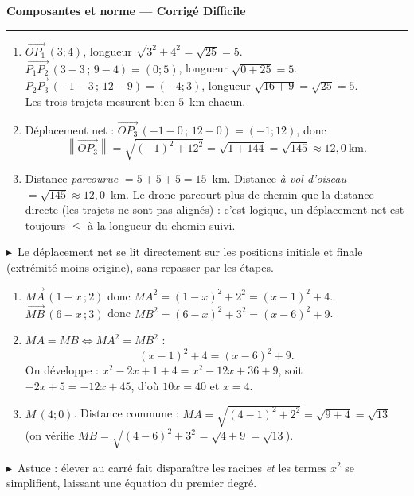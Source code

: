 \documentclass[11pt,a4paper]{article}
\newcommand{\vc}[1]{\overrightarrow{#1}}
\providecommand{\norm}[1]{\left\lVert #1\right\rVert}
\newcommand{\cor}[1]{\medskip\noindent{\color{primarydark}\bfseries\large Corrigé #1.}\par\smallskip}
\newcommand{\rep}{\textcolor{excol}{$\blacktriangleright$}\ }
\begin{document}
\begin{center}
{\LARGE\bfseries\color{primarydark}Composantes et norme — Corrigé Difficile}\\[2pt]
{\color{primary}\rule{0.5\linewidth}{1.1pt}}
\end{center}
\vspace{2mm}

\cor{1}
\begin{enumerate}[label=\textbf{\alph*)},leftmargin=2em,itemsep=3pt]
  \item $\vc{OP_1}\,(3;4)$, longueur $\sqrt{3^2+4^2}=\sqrt{25}=5$.\\
        $\vc{P_1P_2}\,(3-3\,;\,9-4)=(0;5)$, longueur $\sqrt{0+25}=5$.\\
        $\vc{P_2P_3}\,(-1-3\,;\,12-9)=(-4;3)$, longueur $\sqrt{16+9}=\sqrt{25}=5$.\\
        Les trois trajets mesurent bien $5$~km chacun.
  \item Déplacement net : $\vc{OP_3}\,(-1-0\,;\,12-0)=(-1;12)$, donc
        \[\norm{\vc{OP_3}}=\sqrt{(-1)^2+12^2}=\sqrt{1+144}=\sqrt{145}\approx 12{,}0~\text{km}.\]
  \item Distance \emph{parcourue} $=5+5+5=15$~km. Distance \emph{à vol d'oiseau}
        $=\sqrt{145}\approx 12{,}0$~km. Le drone parcourt plus de chemin que la distance directe
        (les trajets ne sont pas alignés) : c'est logique, un déplacement net est toujours
        $\leq$ à la longueur du chemin suivi.
\end{enumerate}
\rep Le déplacement net se lit directement sur les positions initiale et finale (\og{}extrémité moins
origine\fg{}), sans repasser par les étapes.

\cor{2}
\begin{enumerate}[label=\textbf{\alph*)},leftmargin=2em,itemsep=3pt]
  \item $\vc{MA}\,(1-x\,;2)$ donc $MA^2=(1-x)^2+2^2=(x-1)^2+4$.\\
        $\vc{MB}\,(6-x\,;3)$ donc $MB^2=(6-x)^2+3^2=(x-6)^2+9$.
  \item $MA=MB \iff MA^2=MB^2$ :
        \[(x-1)^2+4=(x-6)^2+9.\]
        On développe : $x^2-2x+1+4=x^2-12x+36+9$, soit $-2x+5=-12x+45$, d'où
        $10x=40$ et $\boxed{x=4}$.
  \item $M\,(4;0)$. Distance commune : $MA=\sqrt{(4-1)^2+2^2}=\sqrt{9+4}=\sqrt{13}$
        (on vérifie $MB=\sqrt{(4-6)^2+3^2}=\sqrt{4+9}=\sqrt{13}$).
\end{enumerate}
\rep Astuce : élever au carré fait disparaître les racines \emph{et} les termes $x^2$ se simplifient,
laissant une équation du premier degré.
\end{document}
